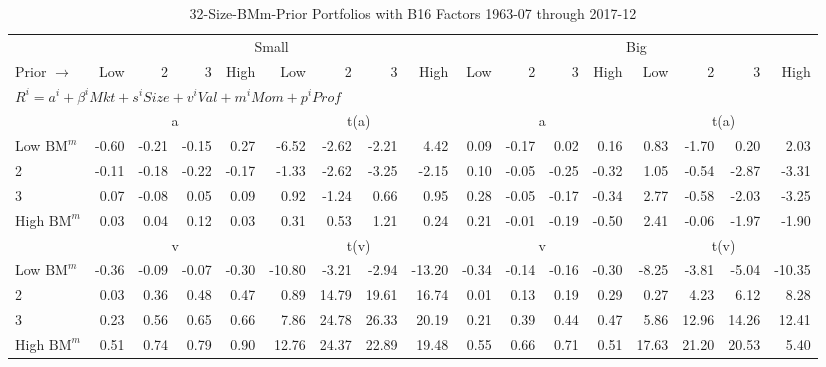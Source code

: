 
\begin{table}[!ht]
\footnotesize
\centering
\caption{32-Size-BMm-Prior Portfolios with B16 Factors 1963-07 through 2017-12}
\begin{tabular}{lrrrrrrrrrrrrrrrr}
  \toprule
                        & \multicolumn{8}{c}{Small} & \multicolumn{8}{c}{Big} \\
                          \cmidrule(r){2-9} \cmidrule(r){10-17}

    Prior $\rightarrow$ & Low & 2 & 3 & High & Low & 2 & 3 & High & Low & 2 & 3 & High & Low & 2 & 3 & High \\ 

  \midrule

  \multicolumn{17}{l}{$R^i=a^i+\beta^iMkt+s^iSize+v^iVal+m^iMom+p^iProf$} \\

                        & \multicolumn{4}{c}{a} & \multicolumn{4}{c}{t(a)} & \multicolumn{4}{c}{a} & \multicolumn{4}{c}{t(a)} \\
                          \cmidrule(r){2-5} \cmidrule(r){6-9} \cmidrule(r){10-13} \cmidrule(r){14-17}

    Low $\text{BM}^m$   & -0.60  & -0.21  & -0.15  & 0.27  & -6.52  & -2.62  & -2.21  & 4.42  & 0.09  & -0.17  & 0.02  & 0.16  & 0.83  & -1.70  & 0.20  & 2.03  \\
                     2  & -0.11  & -0.18  & -0.22  & -0.17  & -1.33  & -2.62  & -3.25  & -2.15  & 0.10  & -0.05  & -0.25  & -0.32  & 1.05  & -0.54  & -2.87  & -3.31  \\
                     3  & 0.07  & -0.08  & 0.05  & 0.09  & 0.92  & -1.24  & 0.66  & 0.95  & 0.28  & -0.05  & -0.17  & -0.34  & 2.77  & -0.58  & -2.03  & -3.25  \\
    High $\text{BM}^m$  & 0.03  & 0.04  & 0.12  & 0.03  & 0.31  & 0.53  & 1.21  & 0.24  & 0.21  & -0.01  & -0.19  & -0.50  & 2.41  & -0.06  & -1.97  & -1.90  \\

                        & \multicolumn{4}{c}{v} & \multicolumn{4}{c}{t(v)} & \multicolumn{4}{c}{v} & \multicolumn{4}{c}{t(v)} \\
                          \cmidrule(r){2-5} \cmidrule(r){6-9} \cmidrule(r){10-13} \cmidrule(r){14-17}

    Low $\text{BM}^m$   & -0.36  & -0.09  & -0.07  & -0.30  & -10.80  & -3.21  & -2.94  & -13.20  & -0.34  & -0.14  & -0.16  & -0.30  & -8.25  & -3.81  & -5.04  & -10.35  \\
                     2  & 0.03  & 0.36  & 0.48  & 0.47  & 0.89  & 14.79  & 19.61  & 16.74  & 0.01  & 0.13  & 0.19  & 0.29  & 0.27  & 4.23  & 6.12  & 8.28  \\
                     3  & 0.23  & 0.56  & 0.65  & 0.66  & 7.86  & 24.78  & 26.33  & 20.19  & 0.21  & 0.39  & 0.44  & 0.47  & 5.86  & 12.96  & 14.26  & 12.41  \\
    High $\text{BM}^m$  & 0.51  & 0.74  & 0.79  & 0.90  & 12.76  & 24.37  & 22.89  & 19.48  & 0.55  & 0.66  & 0.71  & 0.51  & 17.63  & 21.20  & 20.53  & 5.40  \\


\end{tabular}
\end{table}
